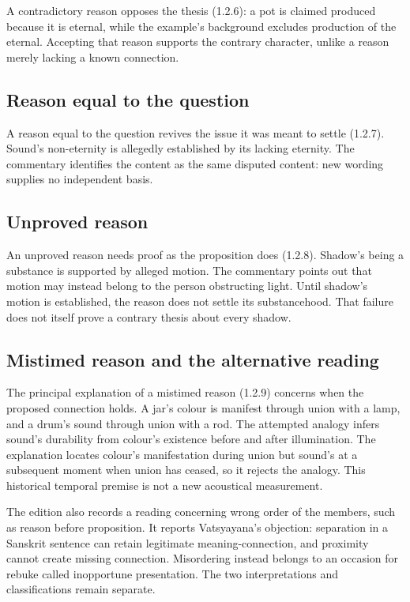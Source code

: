 A contradictory reason opposes the thesis (1.2.6): a pot is claimed
produced because it is eternal, while the example's background excludes
production of the eternal. Accepting that reason supports the contrary
character, unlike a reason merely lacking a known connection.

\subsection{Reason equal to the question}

A reason equal to the question revives the issue it was meant to settle
(1.2.7). Sound's non-eternity is allegedly established by its lacking
eternity. The commentary identifies the content as the same disputed
content: new wording supplies no independent basis.

\subsection{Unproved reason}

An unproved reason needs proof as the proposition does (1.2.8).
Shadow's being a substance is supported by alleged motion. The
commentary points out that motion may instead belong to the person
obstructing light. Until shadow's motion is established, the reason
does not settle its substancehood. That failure does not itself prove
a contrary thesis about every shadow.

\subsection{Mistimed reason and the alternative reading}

The principal explanation of a mistimed reason (1.2.9) concerns when
the proposed connection holds. A jar's colour is manifest through union
with a lamp, and a drum's sound through union with a rod. The attempted
analogy infers sound's durability from colour's existence before and
after illumination. The explanation locates colour's manifestation
during union but sound's at a subsequent moment when union has ceased,
so it rejects the analogy. This historical temporal premise is not a
new acoustical measurement.

The edition also records a reading concerning wrong order of the members,
such as reason before proposition. It reports Vatsyayana's objection:
separation in a Sanskrit sentence can retain legitimate meaning-connection,
and proximity cannot create missing connection. Misordering instead
belongs to an occasion for rebuke called inopportune presentation.
The two interpretations and classifications remain separate.

